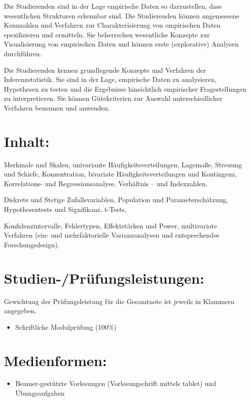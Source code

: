 Die Studierenden sind in der Lage empirische Daten so darzustellen, dass
wesentlichen Strukturen erkennbar sind. Die Studierenden können
angemessene Kennzahlen und Verfahren zur Charakterisierung von
empirischen Daten spezifizieren und ermitteln. Sie beherrschen
wesentliche Konzepte zur Visualisierung von empirischen Daten und können
erste (explorative) Analysen durchführen.

Die Studierenden kennen grundlegende Konzepte und Verfahren der
Inferenzstatistik. Sie sind in der Lage, empirische Daten zu
analysieren, Hypothesen zu testen und die Ergebnisse hinsichtlich
empirischer Fragestellungen zu interpretieren. Sie können Gütekriterien
zur Auswahl unterschiedlicher Verfahren benennen und anwenden.

\section*{Inhalt:}\label{inhalt-6}

Merkmale und Skalen, univariante Häufigkeitsverteilungen, Lagemaße,
Streuung und Schiefe, Konzentration, bivariate Häufigkeitsverteilungen
und Kontingenz, Korrelations- und Regressionsanalyse, Verhältnis -- und
Indexzahlen.

Diskrete und Stetige Zufallsvariablen, Population und
Parameterschätzung, Hypothesentests und Signifikanz, t-Tests,

Konfidenzintervalle, Fehlertypen, Effektstärken und Power, multivariate
Verfahren (ein- und mehrfaktorielle Varianzanalysen und entsprechendes
Forschungsdesign).

\section*{Studien-/Prüfungsleistungen:}\label{studien-pruxfcfungsleistungen-6}

Gewichtung der Prüfungsleistung für die Gesamtnote ist jeweils in
Klammern angegeben.

\begin{itemize}
\tightlist
\item
  Schriftliche Modulprüfung (100\%)
\end{itemize}

\section*{Medienformen:}\label{medienformen-6}

\begin{itemize}
\tightlist
\item
  Beamer-gestützte Vorlesungen (Vorlesungschrift mittels tablet) und
  Übungsaufgaben
\end{itemize}


